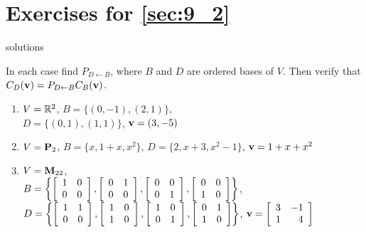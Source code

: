 \section*{Exercises for \ref{sec:9_2}}

\begin{Filesave}{solutions}
\end{Filesave}

\begin{multicols}{2}
\begin{ex}
In each case find $P_{D \gets B}$, where $B$ and $D$ are ordered bases of $V$. Then verify that \\ $C_{D}(\textbf{v}) = P_{D \gets B}C_{B}(\textbf{v})$.


\begin{enumerate}[label={\alph*.}]
\item $V = \mathbb{R}^2$, $B = \{(0, -1), (2, 1)\}$,\\  $D = \{(0, 1), (1, 1)\}$, $\textbf{v} = (3, -5)$


\item $V = \textbf{P}_2$, $B = \{x, 1 + x, x^2\}$, $D = \{2, x + 3, x^2 - 1\}$, $\textbf{v} = 1 + x + x^2$


\item $V = \textbf{M}_{22}$, \\ \hspace*{-2em}$B = \left\{ \left[ \begin{array}{rr} 1 & 0 \\ 0 & 0 \end{array} \right], \left[ \begin{array}{rr} 0 & 1 \\ 0 & 0 \end{array} \right], \left[ \begin{array}{rr} 0 & 0 \\ 0 & 1 \end{array} \right], \left[ \begin{array}{rr} 0 & 0 \\ 1 & 0 \end{array} \right] \right\}$, \\
\hspace*{-2em}$D = \left\{ \left[ \begin{array}{rr} 1 & 1 \\ 0 & 0 \end{array} \right], \left[ \begin{array}{rr} 1 & 0 \\ 1 & 0 \end{array} \right], \left[ \begin{array}{rr} 1 & 0 \\ 0 & 1 \end{array} \right], \left[ \begin{array}{rr} 0 & 1 \\ 1 & 0 \end{array} \right] \right\}$, $\textbf{v} = \left[ \begin{array}{rr} 3 & -1 \\ 1 & 4 \end{array} \right]$



\end{enumerate}
\end{ex}
\end{multicols}
